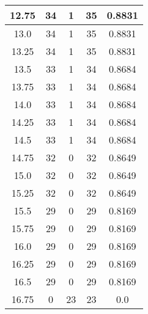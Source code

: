 \documentclass[letterpaper, 12pt]{article}
\begin{document}
\begin{longtable}{|c|c|c|c|c|}
\hline
12.75 & 34 & 1 & 35 & 0.8831 \\
\hline
13.0 & 34 & 1 & 35 & 0.8831 \\
\hline
13.25 & 34 & 1 & 35 & 0.8831 \\
\hline
13.5 & 33 & 1 & 34 & 0.8684 \\
\hline
13.75 & 33 & 1 & 34 & 0.8684 \\
\hline
14.0 & 33 & 1 & 34 & 0.8684 \\
\hline
14.25 & 33 & 1 & 34 & 0.8684 \\
\hline
14.5 & 33 & 1 & 34 & 0.8684 \\
\hline
14.75 & 32 & 0 & 32 & 0.8649 \\
\hline
15.0 & 32 & 0 & 32 & 0.8649 \\
\hline
15.25 & 32 & 0 & 32 & 0.8649 \\
\hline
15.5 & 29 & 0 & 29 & 0.8169 \\
\hline
15.75 & 29 & 0 & 29 & 0.8169 \\
\hline
16.0 & 29 & 0 & 29 & 0.8169 \\
\hline
16.25 & 29 & 0 & 29 & 0.8169 \\
\hline
16.5 & 29 & 0 & 29 & 0.8169 \\
\hline
16.75 & 0 & 23 & 23 & 0.0 \\
\hline
\end{longtable}
\end{document}
